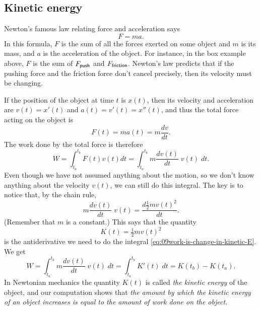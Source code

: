 \subsection{Kinetic energy}
Newton's famous law relating force and acceleration says
\[
  F=ma.
\]
In this formula, $F$ is the sum of all the forces exerted on some object and 
$m$ is its mass, and $a$ is the acceleration of the object.
For instance, in the box example above, $F$ is the sum of $F_{\sf push}$ and
$F_{\sf friction}$.  Newton's law predicts that if the pushing force and the
friction force don't cancel precisely, then its velocity must be changing.

If the position of the object at time $t$ is $x(t)$, then its velocity and
acceleration are $v(t) = x'(t)$ and $a(t) = v'(t) = x''(t)$, and thus the total
force acting on the object is
\[
F(t) = ma(t) = m \frac{dv}{dt}.
\]
The work done by the total force is therefore
\begin{equation}
  \label{eq:09work-is-change-in-kinetic-E}
  W = \int_{t_a}^{t_b} F(t)v(t)dt
  =\int_{t_a}^{t_b} m \frac{dv(t)}{dt}\;v(t)\;dt.
\end{equation}
Even though we have not assumed anything about the motion, so we don't know
anything about the velocity $v(t)$, we can still do this integral.  The key is
to notice that, by the chain rule,
\[
m \frac{dv(t)}{dt}\;v(t) = \frac{d\frac12m v(t)^2}{dt}.
\]
(Remember that $m$ is a constant.)  This says that the quantity
\[
K(t) = \tfrac12 m v(t)^2
\]
is the antiderivative we need to do the integral
\eqref{eq:09work-is-change-in-kinetic-E}.  We get
\[
W = \int_{t_a}^{t_b} m \frac{dv(t)}{dt}\;v(t)\;dt = \int_{t_a}^{t_b} K'(t)\;dt
=K(t_b) - K(t_a).
\]
In Newtonian mechanics the quantity $K(t)$ is called \emph{the kinetic energy}
of the object, and our computation shows that \textit{the amount by which the
kinetic energy of an object increases is equal to the amount of work done on
the object. }

